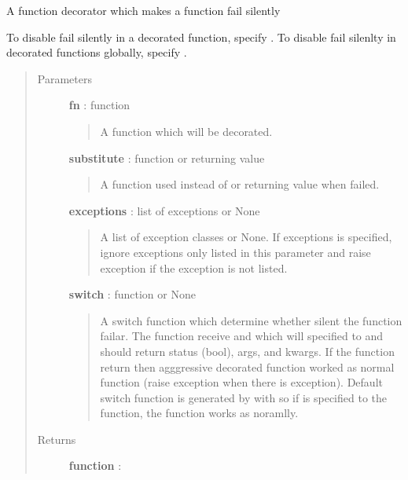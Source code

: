 \documentclass[letterpaper,10pt,english]{sphinxmanual}
\begin{document}
\begin{fulllineitems}
\label{tolerance:tolerance.tolerate}
A function decorator which makes a function fail silently

To disable fail silently in a decorated function, specify
.
To disable fail silenlty in decorated functions globally, specify
.
\begin{quote}\begin{description}
\item[{Parameters }] \leavevmode
\textbf{fn} : function
\begin{quote}

A function which will be decorated.
\end{quote}

\textbf{substitute} : function or returning value
\begin{quote}

A function used instead of  or returning value
when  failed.
\end{quote}

\textbf{exceptions} : list of exceptions or None
\begin{quote}

A list of exception classes or None. 
If exceptions is specified, ignore exceptions only listed in this
parameter and raise exception if the exception is not listed.
\end{quote}

\textbf{switch} : function or None
\begin{quote}

A switch function which determine whether silent the function failar.
The function receive  and  which will specified
to  and should return status (bool), args, and kwargs.
If the function return  then agggressive decorated function
worked as normal function (raise exception when there is exception).
Default switch function is generated by
{\hyperref[tolerance:tolerance.argument_switch_generator]{}} with
so if  is specified to the function, the function
works as noramlly.
\end{quote}

\item[{Returns }] \leavevmode
\textbf{function} :
\begin{quote}


\end{quote}
\end{description}
\end{quote}
\end{fulllineitems}
\end{document}
